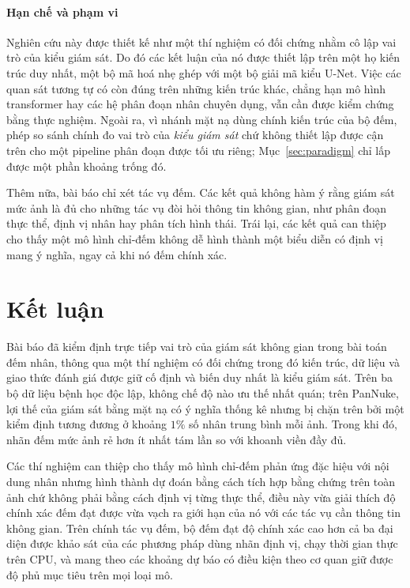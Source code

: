 \documentclass[preprint,12pt]{elsarticle}
\begin{document}
\paragraph{Hạn chế và phạm vi} Nghiên cứu này được thiết kế như một thí nghiệm có đối chứng nhằm cô lập vai trò
của kiểu giám sát. Do đó các kết luận của nó được thiết lập trên một họ kiến trúc duy nhất, một bộ mã hoá nhẹ ghép
với một bộ giải mã kiểu U-Net. Việc các quan sát tương tự có còn đúng trên những kiến trúc khác, chẳng hạn mô hình
transformer hay các hệ phân đoạn nhân chuyên dụng, vẫn cần được kiểm chứng bằng thực nghiệm. Ngoài ra, vì nhánh
mặt nạ dùng chính kiến trúc của bộ đếm, phép so sánh chính đo vai trò của \emph{kiểu giám sát} chứ không thiết lập
được cận trên cho một pipeline phân đoạn được tối ưu riêng; Mục~\ref{sec:paradigm} chỉ lấp được một phần khoảng
trống đó.

Thêm nữa, bài báo chỉ xét tác vụ đếm. Các kết quả không hàm ý rằng giám sát mức ảnh là đủ cho những tác vụ đòi hỏi
thông tin không gian, như phân đoạn thực thể, định vị nhân hay phân tích hình thái. Trái lại, các kết quả can
thiệp cho thấy một mô hình chỉ-đếm không dễ hình thành một biểu diễn có định vị mang ý nghĩa, ngay cả khi nó đếm
chính xác.

\section{Kết luận}\label{sec:conclusion}

Bài báo đã kiểm định trực tiếp vai trò của giám sát không gian trong bài toán đếm nhân, thông qua một thí nghiệm
có đối chứng trong đó kiến trúc, dữ liệu và giao thức đánh giá được giữ cố định và biến duy nhất là kiểu giám sát.
Trên ba bộ dữ liệu bệnh học độc lập, không chế độ nào ưu thế nhất quán; trên PanNuke, lợi thế của giám sát bằng
mặt nạ có ý nghĩa thống kê nhưng bị chặn trên bởi một kiểm định tương đương ở khoảng $1\%$ số nhân trung bình mỗi
ảnh. Trong khi đó, nhãn đếm mức ảnh rẻ hơn ít nhất tám lần so với khoanh viền đầy đủ.

Các thí nghiệm can thiệp cho thấy mô hình chỉ-đếm phản ứng đặc hiệu với nội dung nhân nhưng hình thành dự đoán
bằng cách tích hợp bằng chứng trên toàn ảnh chứ không phải bằng cách định vị từng thực thể, điều này vừa giải
thích độ chính xác đếm đạt được vừa vạch ra giới hạn của nó với các tác vụ cần thông tin không gian. Trên chính
tác vụ đếm, bộ đếm đạt độ chính xác cao hơn cả ba đại diện được khảo sát của các phương pháp dùng nhãn định vị,
chạy thời gian thực trên CPU, và mang theo các khoảng dự báo có điều kiện theo cơ quan giữ được độ phủ mục tiêu
trên mọi loại mô.
\end{document}
